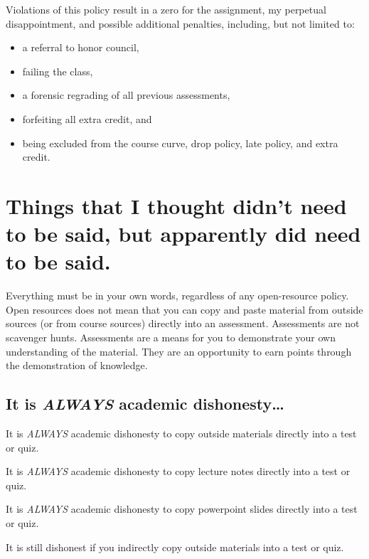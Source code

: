 Violations of this policy result in a zero for the assignment, my perpetual disappointment, and possible additional penalties, including, but not limited to:

\begin{itemize}
\tightlist
\item
  a referral to honor council,
\item
  failing the class,
\item
  a forensic regrading of all previous assessments,
\item
  forfeiting all extra credit, and
\item
  being excluded from the course curve, drop policy, late policy, and extra credit.
\end{itemize}

\hypertarget{things-that-i-thought-didnt-need-to-be-said-but-apparently-did-need-to-be-said.}{%
\section{Things that I thought didn't need to be said, but apparently did need to be said.}\label{things-that-i-thought-didnt-need-to-be-said-but-apparently-did-need-to-be-said.}}

Everything must be in your own words, regardless of any open-resource policy.
Open resources does not mean that you can copy and paste material from outside sources (or from course sources) directly into an assessment.
Assessments are not scavenger hunts.
Assessments are a means for you to demonstrate your own understanding of the material.
They are an opportunity to earn points through the demonstration of knowledge.

\hypertarget{it-is-always-academic-dishonesty}{%
\subsection{\texorpdfstring{It is \emph{ALWAYS} academic dishonesty\ldots{}}{It is ALWAYS academic dishonesty\ldots{}}}\label{it-is-always-academic-dishonesty}}

It is \emph{ALWAYS} academic dishonesty to copy outside materials directly into a test or quiz.

It is \emph{ALWAYS} academic dishonesty to copy lecture notes directly into a test or quiz.

It is \emph{ALWAYS} academic dishonesty to copy powerpoint slides directly into a test or quiz.

It is still dishonest if you indirectly copy outside materials into a test or quiz.

